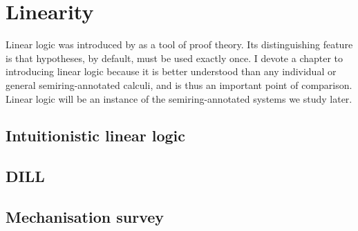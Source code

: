 \chapter{Linearity}\label{sec:linearity}

Linear logic was introduced by \citet{girard87linear} as a tool of proof theory.
Its distinguishing feature is that hypotheses, by default, must be used exactly
once.
I devote a chapter to introducing linear logic because it is better understood
than any individual or general semiring-annotated calculi, and is thus an
important point of comparison.
Linear logic will be an instance of the semiring-annotated systems we study
later.

\section{Intuitionistic linear logic}\label{sec:ill}


\section{DILL}


\section{Mechanisation survey}

